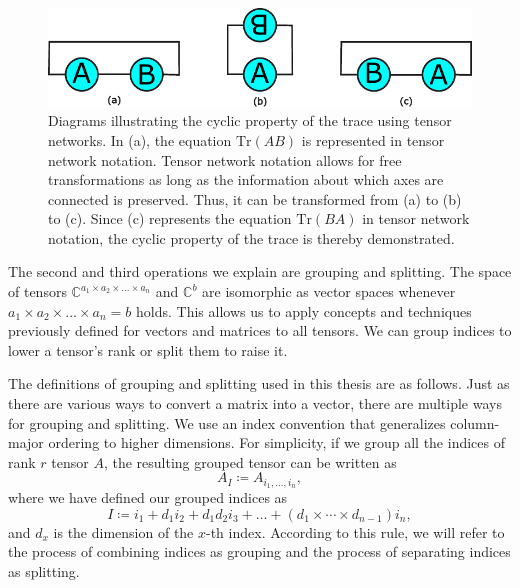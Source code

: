 \documentclass[12pt,dvipdfmx,twoside,openright]{report}
\begin{document}
\begin{figure}
    \centering
    \includegraphics[width=\linewidth]{trace-cyclic.pdf}
    \caption{Diagrams illustrating the cyclic property of the trace using tensor networks. In (a), the equation $\mathrm{Tr}(AB)$ is represented in tensor network notation. Tensor network notation allows for free transformations as long as the information about which axes are connected is preserved. Thus, it can be transformed from (a) to (b) to (c). Since (c) represents the equation $\mathrm{Tr}(BA)$ in tensor network notation, the cyclic property of the trace is thereby demonstrated.}
    \label{fig:trace-cyclic}
\end{figure}

The second and third operations we explain are grouping and splitting.
The space of tensors $\mathbb C^{a_1\times a_2\times \dots \times a_n}$ and $\mathbb C^b$ are isomorphic as vector spaces whenever $a_1\times a_2\times \dots \times a_n=b$ holds.
This allows us to apply concepts and techniques previously defined for vectors and matrices to all tensors.
We can group indices to lower a tensor's rank or split them to raise it.

The definitions of grouping and splitting used in this thesis are as follows.
Just as there are various ways to convert a matrix into a vector, there are multiple ways for grouping and splitting.
We use an index convention that generalizes column-major ordering to higher dimensions.
For simplicity, if we group all the indices of rank $r$ tensor $A$, the resulting grouped tensor can be written as
\begin{equation}
    A_I \coloneqq A_{i_1,\dots,i_n},
\end{equation}
where we have defined our grouped indices as
\begin{equation}
    I \coloneqq i_1 + d_1 i_2 + d_1 d_2 i_3 + \dots + (d_1 \times \cdots \times d_{n-1}) i_n ,
\end{equation}
and $d_x$ is the dimension of the $x$-th index.
According to this rule, we will refer to the process of combining indices as grouping and the process of separating indices as splitting.
\end{document}
